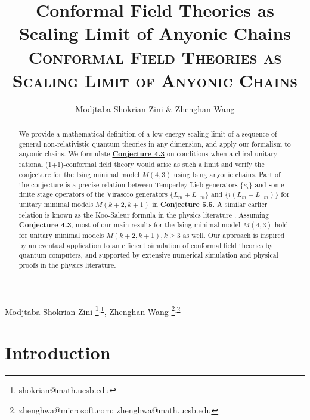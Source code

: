 \documentclass[twoside,11pt,titlepage]{amsart}
\author{Modjtaba Shokrian Zini & Zhenghan Wang}
\title{Conformal Field Theories as Scaling Limit of Anyonic Chains}
\title{\LARGE{\bf
\textsc{Conformal Field Theories as Scaling Limit of Anyonic Chains
}}}
\makeatletter
\newcommand{\authorfootnotes}{\renewcommand\thefootnote{\@fnsymbol\c@footnote}}%
\renewcommand{\maketitle} %
{ \begingroup \vskip 10pt \begin{center} \large {\bf \@title}
	\vskip 10pt \large \@author \hskip 20pt \@date \end{center}
  \vskip 10pt \endgroup \setcounter{footnote}{0} }
\renewcommand{\=}[1]{\stackrel{#1}{=}} %
\theoremstyle{definition}
\theoremstyle{remark}
\makeatother
\begin{document}
\begin{center}
  \LARGE 
   \maketitle \par \bigskip

  \normalsize
  \authorfootnotes
  Modjtaba Shokrian Zini \footnote{shokrian@math.ucsb.edu}\textsuperscript{,\hyperref[1]{1}}, Zhenghan Wang \footnote{zhenghwa@microsoft.com;
  zhenghwa@math.ucsb.edu}\textsuperscript{,\hyperref[2]{2}} \par 
  \bigskip
\end{center}

\begin{abstract}

We provide a mathematical definition of a low energy scaling limit of a sequence of general non-relativistic quantum theories in any dimension, and apply our formalism to anyonic chains.  We formulate \hyperref[cnj4.3]{\textbf{Conjecture 4.3}} on conditions when a chiral unitary rational (1+1)-conformal field theory would arise as such a limit and verify the conjecture for the Ising minimal model $M(4,3)$ using Ising anyonic chains.  Part of the conjecture is a precise relation between Temperley-Lieb generators $\{e_i\}$ and some finite stage operators of the Virasoro generators $\{L_m+L_{-m}\}$ and $\{i(L_m-L_{-m})\}$ for unitary minimal models $M(k+2,k+1)$ in \hyperref[cnj5.5]{\textbf{Conjecture 5.5}}.  A similar earlier relation is known as the Koo-Saleur formula in the physics literature \cite{koo1994representations}. Assuming \hyperref[cnj4.3]{\textbf{Conjecture 4.3}}, most of our main results for the Ising minimal model $M(4,3)$ hold for unitary minimal models $M(k+2,k+1), k\geq 3$ as well. Our approach is inspired by an eventual application to an efficient simulation of conformal field theories by quantum computers, and supported by extensive numerical simulation and physical proofs in the physics literature.

\end{abstract}

\tableofcontents


\section{Introduction}\label{0}
\end{document}
